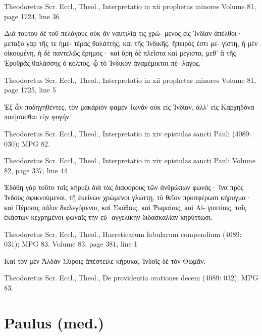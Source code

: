 \documentclass[12pt,letterpaper,twoside,final]{memoir}
\begin{document}
\begin{greek}
Theodoretus Scr. Eccl., Theol., Interpretatio in xii prophetas minores 
Volume 81, page 1724, line 36

Διὰ τούτου δὲ τοῦ πελάγους οὐκ ἂν ναυτιλίᾳ τις χρώ-
μενος εἰς Ἰνδίαν ἀπέλθοι· μεταξὺ γὰρ τῆς τε ἡμε-
τέρας θαλάττης, καὶ τῆς Ἰνδικῆς, ἤπειρός ἐστι με-
γίστη, ἡ μὲν οἰκουμένη, ἡ δὲ παντελῶς ἔρημος· καὶ 
ὄρη δὲ πλεῖστα καὶ μέγιστα, μεθ' ἃ τῆς Ἐρυθρᾶς 
θαλάσσης ὁ κόλπος, ᾧ τὸ Ἰνδικὸν ἀναμέμικται πέ-
λαγος. 



Theodoretus Scr. Eccl., Theol., Interpretatio in xii prophetas minores 
Volume 81, page 1725, line 5

                          Ἐξ ὧν ποδηγηθέντες, τὸν 
μακάριόν φαμεν Ἰωνᾶν οὐκ εἰς Ἰνδίαν, ἀλλ' εἰς 
Καρχηδόνα ποιήσασθαι τὴν φυγήν. 



Theodoretus Scr. Eccl., Theol., Interpretatio in xiv epistulas sancti Pauli (4089: 030); MPG 82.

Theodoretus Scr. Eccl., Theol., Interpretatio in xiv epistulas sancti Pauli 
Volume 82, page 337, line 44

                        Ἐδόθη γὰρ τοῦτο τοῖς κήρυξι 
διὰ τὰς διαφόρους τῶν ἀνθρώπων φωνάς· ἵνα πρὸς 
Ἰνδοὺς ἀφικνούμενοι, τῇ ἐκείνων χρώμενοι γλώττῃ, 
τὸ θεῖον προσφέρωσι κήρυγμα· καὶ Πέρσαις πάλιν 
διαλεγόμενοι, καὶ Σκύθαις, καὶ Ῥωμαίοις, καὶ Αἰ-
γυπτίοις, ταῖς ἑκάστων κεχρημένοι φωναῖς τὴν εὐ-
αγγελικὴν διδασκαλίαν κηρύττωσι. 



Theodoretus Scr. Eccl., Theol., Haereticarum fabularum compendium (4089: 031); MPG 83.
Volume 83, page 381, line 1

                                   Καὶ τὸν μὲν   
Ἀλδὰν Σύροις ἀπέστειλε κήρυκα, Ἰνδοῖς δὲ τὸν 
Θωμᾶν. 



Theodoretus Scr. Eccl., Theol., De providentia orationes decem (4089: 032); MPG 83.

\end{greek}

\section{Paulus (med.)}
\end{document}
